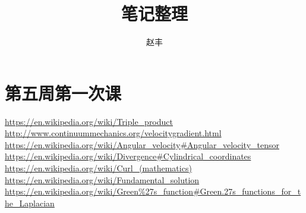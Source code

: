 \documentclass{article}
\begin{document}
\title{笔记整理}
\author{赵丰}
\maketitle
\section{第五周第一次课}

\begin{thebibliography}{9}
 \href{https://en.wikipedia.org/wiki/Triple_product}{https://en.wikipedia.org/wiki/Triple\_product}
\href{http://www.continuummechanics.org/velocitygradient.html}{http://www.continuummechanics.org/velocitygradient.html}
\href{https://en.wikipedia.org/wiki/Angular_velocity#Angular_velocity_tensor}{https://en.wikipedia.org/wiki/Angular\_velocity\#Angular\_velocity\_tensor}
\href{https://en.wikipedia.org/wiki/Divergence#Cylindrical_coordinates}{https://en.wikipedia.org/wiki/Divergence\#Cylindrical\_coordinates}
\href{https://en.wikipedia.org/wiki/Curl_(mathematics)}{https://en.wikipedia.org/wiki/Curl\_(mathematics)}
\href{https://en.wikipedia.org/wiki/Fundamental_solution}{https://en.wikipedia.org/wiki/Fundamental\_solution}
\href{https://en.wikipedia.org/wiki/Green\%27s_function#Green.27s_functions_for_the_Laplacian}{https://en.wikipedia.org/wiki/Green\%27s\_function\#Green.27s\_functions\_for\_the\_Laplacian}
\end{thebibliography}
\end{document}
